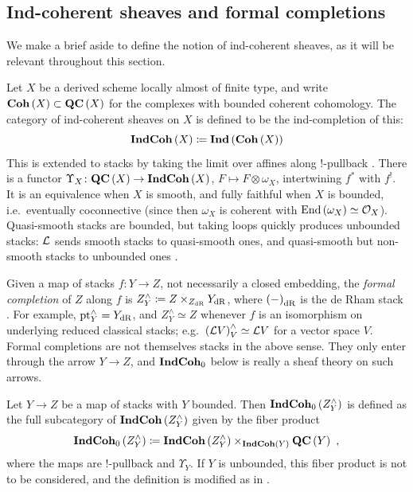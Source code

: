\subsection{Ind-coherent sheaves and formal completions}
\label{sec:IndCoh}

We make a brief aside to define the notion of ind-coherent sheaves, as it will be relevant
throughout this section.

Let $X$ be a derived scheme locally almost of finite type, and write
$\mathbf{Coh}\left(X\right) \subset \mathbf{QC}\left(X\right)$ for the complexes with bounded coherent
cohomology. The category of ind-coherent sheaves on $X$ is defined to be the
ind-completion of this:
\begin{equation*}
\mathbf{IndCoh}\left(X\right)\coloneqq \mathbf{Ind}\left(\mathbf{Coh}\left(X\right)\right)
\end{equation*}
This is extended to stacks by taking the limit over affines along $!$-pullback
\cite[Part II]{GR:v1}.
There is a functor
$\Upsilon_X \colon \mathbf{QC}\left(X\right)\to \mathbf{IndCoh}\left(X\right)$,
$F \mapsto F\otimes \omega_X$, intertwining $f^*$ with $f^!$.
It is an equivalence when $X$ is smooth, and fully faithful when $X$ is bounded, i.e.\
eventually coconnective (since then $\omega_X$ is coherent with
$\operatorname{End}\left(\omega_X\right)\simeq\mathcal{O}_X$). Quasi-smooth stacks are bounded, but taking loops
quickly produces unbounded stacks: $\mathcal{L}$ sends smooth stacks to quasi-smooth ones, and
quasi-smooth but non-smooth stacks to unbounded ones \cite[Section 2.2]{Ber:Sph}.

Given a map of stacks $f\colon Y\to Z$, not necessarily a closed embedding,
the \emph{formal completion} of $Z$ along $f$ is
$Z^\wedge_Y \coloneqq Z\times_{Z_{\text{dR}}} Y_{\text{dR}}$,
where $\left(-\right)_{\text{dR}}$ is the de Rham stack \cite{GR:v2}.
For example, $\text{pt}^\wedge_Y = Y_{\text{dR}}$, and $Z^\wedge_Y\simeq Z$ whenever $f$ is an
isomorphism on underlying reduced classical stacks; e.g.\
$\left(\mathcal{L} V\right)^\wedge_V\simeq \mathcal{L} V$ for a vector space $V$.
Formal completions are not themselves stacks in the above sense. They only enter through
the arrow $Y\to Z$, and $\mathbf{IndCoh}_0$ below is really a sheaf theory on such arrows.

\begin{defn}
\label{defn:IndCoh0}
Let $Y\to Z$ be a map of stacks with $Y$ bounded. Then
$\mathbf{IndCoh}_0\left(Z^\wedge_Y\right)$ is defined as the full subcategory of
$\mathbf{IndCoh}\left(Z^\wedge_Y\right)$ given by the fiber product
\begin{equation*}
\mathbf{IndCoh}_0\left(Z^\wedge_Y\right) \coloneqq
\mathbf{IndCoh}\left(Z^\wedge_Y\right)\times_{\mathbf{IndCoh}\left(Y\right)} \mathbf{QC}\left(Y\right) \ ,
\end{equation*}
where the maps are $!$-pullback and $\Upsilon_Y$.
If $Y$ is unbounded, this fiber product is not to be considered, and the definition is
modified as in \cite[Definition 4.1.6]{Ber:center}.
\end{defn}

